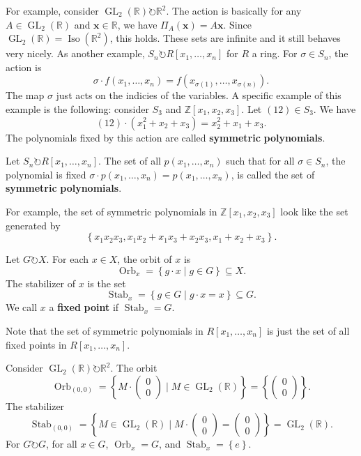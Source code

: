 For example, consider $\operatorname{GL}_2(\mathbb{R}) \circlearrowright \mathbb{R}^2$. The action is basically for any  $A\in \operatorname{GL}_2(\mathbb{R}) $ and $\mathbf{x}\in \mathbb{R}$, we have $\Pi_A(\mathbf{x})=A \mathbf{x}$. Since $\operatorname{GL}_2(\mathbb{R}) =\operatorname{Iso}(\mathbb{R}^2) $, this holds. These sets are infinite and it still behaves very nicely. As another example, $S_n\circlearrowright R[x_1, \ldots, x_n]$ for $R$ a ring. For $\sigma \in S_n$, the action is
\[
	\sigma \cdot f(x_1, \ldots,x_n)=f(x_{\sigma (1)}, \ldots, x_{\sigma (n)})
.\]
The map $\sigma $ just acts on the indicies of the variables. A specific  example of this example is the following: consider $S_3$ and $\mathbb{Z}[x_1,x_2,x_3]$. Let $(12)\in S_3$. We have
\[
	(12)\cdot \left( x_1^2+x_2+x_3 \right) =x_2^2+x_1+x_3
.\]
The polynomials fixed by this action are called \textbf{symmetric} \textbf{polynomials}.
\begin{definition}\label{dfn:SPDN}
	Let $S_n\circlearrowright R[x_1, \ldots, x_n]$. The set of all $p(x_1, \ldots, x_n)$ such that for all $\sigma \in S_n$, the polynomial is fixed $\sigma \cdot p(x_1, \ldots, x_n)=p(x_1, \ldots, x_n)$, is called the set of \textbf{symmetric} \textbf{polynomials}.
\end{definition}
For example, the set of symmetric polynomials in $\mathbb{Z}[x_1,x_2,x_3]$ look like the set generated by
\[\left\{ x_1x_2x_3,x_1x_2+x_1x_3+x_2x_3,x_1+x_2+x_3 \right\} .\]
\begin{definition}\label{dfn:kjsd}
	Let $G\circlearrowright X$. For each $x\in X$, the orbit  of $x$ is
	\[
		\operatorname{Orb}_x = \left\{ g\cdot x \mid g\in G \right\}\subseteq X  
	.\]
	The stabilizer of $x$ is the set
	\[
		\operatorname{Stab}_x=\left\{ g\in G \mid g\cdot x=x \right\} \subseteq G 
	.\]
	We call $x$ a \textbf{fixed} \textbf{point} if $\operatorname{Stab}_x=G $.
\end{definition}
Note that the set of symmetric polynomials in $R[x_1, \ldots, x_n]$ is just the set of all fixed points in $R[x_1, \ldots, x_n]$.

Consider $\operatorname{GL}_2(\mathbb{R}) \circlearrowright \mathbb{R}^2$. The orbit
\[
	\operatorname{Orb}_{(0,0)}=\left\{ M\cdot \begin{pmatrix}
		0\\
		0
	\end{pmatrix}  \mid M\in \operatorname{GL}_2(\mathbb{R})  \right\} =\left\{ \begin{pmatrix}
		0\\
		0
	\end{pmatrix}  \right\} 
.\]
The stabilizer
\[
	\operatorname{Stab}_{(0,0)}=\left\{ M\in \operatorname{GL}_2(\mathbb{R})  \mid M\cdot \begin{pmatrix}
		0\\
		0
	\end{pmatrix} =\begin{pmatrix}
		0\\
		0
	\end{pmatrix}  \right\} =\operatorname{GL}_2(\mathbb{R})  
.\]
For $G\circlearrowright G$, for all $x\in G$, $\operatorname{Orb}_x=G $, and $\operatorname{Stab}_x=\left\{ e \right\}  $.

